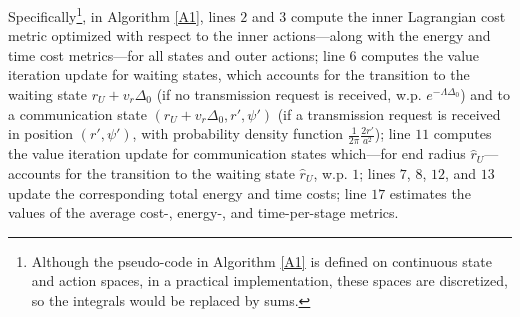 \documentclass[12pt, draftcls, onecolumn]{IEEEtran}
\theoremstyle{plain}
\theoremstyle{definition}
\theoremstyle{remark}
\begin{document}
Specifically\footnote{Although the pseudo-code in Algorithm \ref{A1} is defined on continuous state and action spaces, in a practical implementation, these spaces are discretized, so the integrals would be replaced by sums.}, in Algorithm \ref{A1}, lines $2$ and $3$ compute the inner Lagrangian cost metric optimized with respect to the inner actions---along with the energy and time cost metrics---for all states and outer actions; line $6$ computes the value iteration update for waiting states, which accounts for the transition to the waiting state $r_{U}{+}v_{r}\Delta_{0}$ (if no transmission request is received, w.p. $e^{-\Lambda\Delta_{0}}$) and to a communication state $(r_{U}{+}v_{r}\Delta_{0},r',\psi')$ (if a transmission request is received in position $(r',\psi')$, with probability density function $\frac{1}{2\pi}\frac{2r'}{a^{2}}$); line $11$ computes the value iteration update for communication states which---for end radius $\hat{r}_{U}$---accounts for the transition to the waiting state $\hat{r}_{U}$, w.p. $1$; lines $7$, $8$, $12$, and $13$ update the corresponding total energy and time costs; line $17$ estimates the values of the average cost-, energy-, and time-per-stage metrics.
\end{document}
